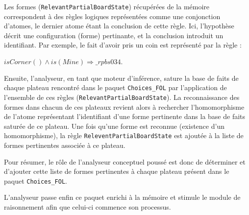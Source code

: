 Les formes (\texttt{RelevantPartialBoardState}) récupérées de la mémoire correspondent à des règles logiques représentées comme une conjonction d'atomes, le dernier atome étant la conclusion de cette règle. Ici, l'hypothèse décrit une configuration (forme) pertinante, et la conclusion introduit un identifiant. Par exemple, le fait d'avoir pris un coin est représenté par la règle :

\textit{$isCorner() \wedge is(Mine) \Longrightarrow \_rpbs034$}. 

Ensuite, l'analyseur, en tant que moteur d'inférence, sature la base de faits de chaque plateau rencontré dans le paquet \texttt{Choices\_FOL} par l'application de l'ensemble de ces règles (\texttt{RelevantPartialBoardState}). La reconnaissance des formes dans chacun de ces plateaux revient alors à rechercher l'homomorphisme de l'atome représentant l'identifiant d'une forme pertinente dans la base de faits saturée de ce plateau. Une fois qu'une forme est reconnue (existence d'un homomorphisme), la règle \texttt{ReleventPartialBoardState} est ajoutée à la liste de formes pertinentes associée à ce plateau.

Pour résumer, le rôle de l'analyseur conceptuel poussé est donc de déterminer et d'ajouter cette liste de formes pertinentes à chaque plateau présent dans le paquet \texttt{Choices\_FOL}. 

L'analyseur passe enfin ce paquet enrichi à la mémoire et stimule le module de raisonnement afin que celui-ci commence son processus. 